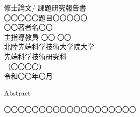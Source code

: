 \documentclass[12pt,a4j]{jreport}
\begin{document}
\thispagestyle{empty}
\begin{center}
修士論文/ 課題研究報告書\\%
\vfill
〇〇〇〇〇題目〇〇〇〇〇\\
\vfill
〇〇著者名〇〇\\
\vfill
主指導教員  〇〇 〇〇\\
\vfill
北陸先端科学技術大学院大学\\
先端科学技術研究科\\
（〇〇〇〇）\\ %
\vfill
令和〇〇年〇月\\ %
\vfill
\end{center}

\clearpage
\thispagestyle{plain}

\centerline{Abstract}
〇〇〇〇〇〇〇〇〇〇〇〇〇〇〇〇〇〇〇
\clearpage

\tableofcontents
\clearpage

\listoffigures
\clearpage
\listoftables
\clearpage

\setcounter{page}{1}












\end{document}
